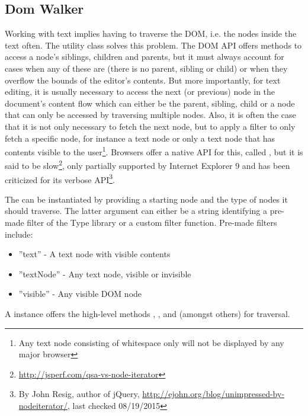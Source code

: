 \subsection{Dom Walker}

Working with text implies having to traverse the DOM, i.e. the nodes inside the text often. The  utility class solves this problem. The DOM API offers methods to access a node's siblings, children and parents, but it must always account for cases when any of these are  (there is no parent, sibling or child) or when they overflow the bounds of the editor's contents. But more importantly, for text editing, it is usually necessary to access the next (or previous) node in the document's content flow which can either be the parent, sibling, child or a node that can only be accessed by traversing multiple nodes. Also, it is often the case that it is not only necessary to fetch the next node, but to apply a filter to only fetch a specific node, for instance a text node or only a text node that has contents visible to the user\footnote{Any text node consisting of whitespace only will not be displayed by any major browser}. Browsers offer a native API for this, called , but it is said to be slow\footnote{\url{http://jsperf.com/qsa-vs-node-iterator}}, only partially supported by Internet Explorer 9\cite{moznode} and has been criticized for its verbose API\footnote{By John Resig, author of jQuery, \url{http://ejohn.org/blog/unimpressed-by-nodeiterator/}, last checked 08/19/2015}.


The  can be instantiated by providing a starting node and the type of nodes it should traverse. The latter argument can either be a string identifying a pre-made filter of the Type library or a custom filter function. Pre-made filters include:

\begin{itemize}
\item ''text'' - A text node with visible contents
\item ''textNode'' - Any text node, visible or invisible
\item ''visible'' - Any visible DOM node
\end{itemize}

A  instance offers the high-level methods , ,  and  (amongst others) for traversal. %

